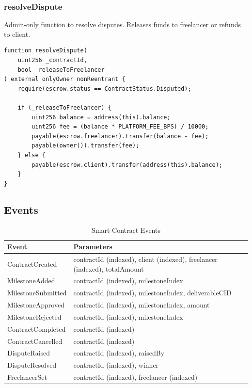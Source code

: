 \documentclass[12pt,a4paper]{article}
\begin{document}
\subsubsection{resolveDispute}
Admin-only function to resolve disputes. Releases funds to freelancer or refunds to client.

\begin{lstlisting}[style=soliditystyle]
function resolveDispute(
    uint256 _contractId,
    bool _releaseToFreelancer
) external onlyOwner nonReentrant {
    require(escrow.status == ContractStatus.Disputed);

    if (_releaseToFreelancer) {
        uint256 balance = address(this).balance;
        uint256 fee = (balance * PLATFORM_FEE_BPS) / 10000;
        payable(escrow.freelancer).transfer(balance - fee);
        payable(owner()).transfer(fee);
    } else {
        payable(escrow.client).transfer(address(this).balance);
    }
}
\end{lstlisting}

\subsection{Events}

\begin{table}[h]
\centering
\begin{tabular}{ll}
\toprule
\textbf{Event} & \textbf{Parameters} \\
\midrule
ContractCreated & contractId (indexed), client (indexed), freelancer (indexed), totalAmount \\
MilestoneAdded & contractId (indexed), milestoneIndex \\
MilestoneSubmitted & contractId (indexed), milestoneIndex, deliverableCID \\
MilestoneApproved & contractId (indexed), milestoneIndex, amount \\
MilestoneRejected & contractId (indexed), milestoneIndex \\
ContractCompleted & contractId (indexed) \\
ContractCancelled & contractId (indexed) \\
DisputeRaised & contractId (indexed), raisedBy \\
DisputeResolved & contractId (indexed), winner \\
FreelancerSet & contractId (indexed), freelancer (indexed) \\
\bottomrule
\end{tabular}
\caption{Smart Contract Events}
\end{table}
\end{document}

